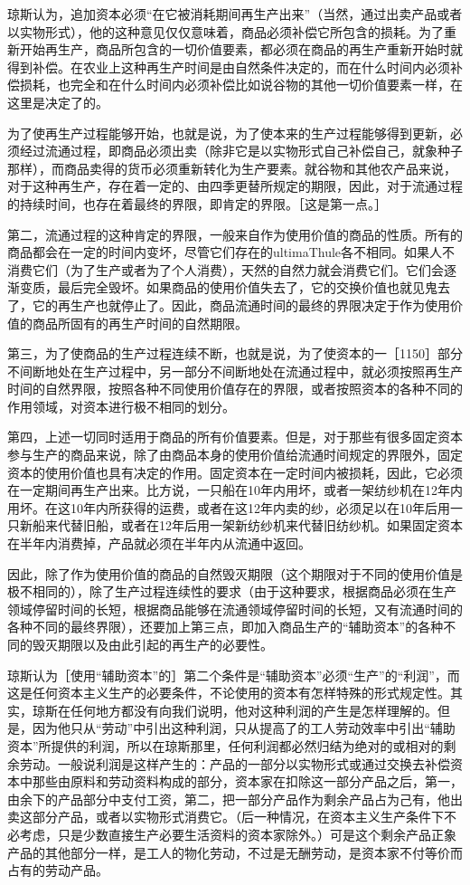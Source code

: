 琼斯认为，追加资本必须“在它被消耗期间再生产出来”（当然，通过出卖产品或者以实物形式），他的这种意见仅仅意味着，商品必须补偿它所包含的损耗。为了重新开始再生产，商品所包含的一切价值要素，都必须在商品的再生产重新开始时就得到补偿。在农业上这种再生产时间是由自然条件决定的，而在什么时间内必须补偿损耗，也完全和在什么时间内必须补偿比如说谷物的其他一切价值要素一样，在这里是决定了的。

为了使再生产过程能够开始，也就是说，为了使本来的生产过程能够得到更新，必须经过流通过程，即商品必须出卖（除非它是以实物形式自己补偿自己，就象种子那样），而商品卖得的货币必须重新转化为生产要素。就谷物和其他农产品来说，对于这种再生产，存在着一定的、由四季更替所规定的期限，因此，对于流通过程的持续时间，也存在着最终的界限，即肯定的界限。［这是第一点。］

第二，流通过程的这种肯定的界限，一般来自作为使用价值的商品的性质。所有的商品都会在一定的时间内变坏，尽管它们存在的ultimaThule各不相同。如果人不消费它们（为了生产或者为了个人消费），天然的自然力就会消费它们。它们会逐渐变质，最后完全毁坏。如果商品的使用价值失去了，它的交换价值也就见鬼去了，它的再生产也就停止了。因此，商品流通时间的最终的界限决定于作为使用价值的商品所固有的再生产时间的自然期限。

第三，为了使商品的生产过程连续不断，也就是说，为了使资本的一［1150］部分不间断地处在生产过程中，另一部分不间断地处在流通过程中，就必须按照再生产时间的自然界限，按照各种不同使用价值存在的界限，或者按照资本的各种不同的作用领域，对资本进行极不相同的划分。

第四，上述一切同时适用于商品的所有价值要素。但是，对于那些有很多固定资本参与生产的商品来说，除了由商品本身的使用价值给流通时间规定的界限外，固定资本的使用价值也具有决定的作用。固定资本在一定时间内被损耗，因此，它必须在一定期间再生产出来。比方说，一只船在10年内用坏，或者一架纺纱机在12年内用坏。在这10年内所获得的运费，或者在这12年内卖的纱，必须足以在10年后用一只新船来代替旧船，或者在12年后用一架新纺纱机来代替旧纺纱机。如果固定资本在半年内消费掉，产品就必须在半年内从流通中返回。

因此，除了作为使用价值的商品的自然毁灭期限（这个期限对于不同的使用价值是极不相同的），除了生产过程连续性的要求（由于这种要求，根据商品必须在生产领域停留时间的长短，根据商品能够在流通领域停留时间的长短，又有流通时间的各种不同的最终界限），还要加上第三点，即加入商品生产的“辅助资本”的各种不同的毁灭期限以及由此引起的再生产的必要性。

琼斯认为［使用“辅助资本”的］第二个条件是“辅助资本”必须“生产”的“利润”，而这是任何资本主义生产的必要条件，不论使用的资本有怎样特殊的形式规定性。其实，琼斯在任何地方都没有向我们说明，他对这种利润的产生是怎样理解的。但是，因为他只从“劳动”中引出这种利润，只从提高了的工人劳动效率中引出“辅助资本”所提供的利润，所以在琼斯那里，任何利润都必然归结为绝对的或相对的剩余劳动。一般说利润是这样产生的：产品的一部分以实物形式或通过交换去补偿资本中那些由原料和劳动资料构成的部分，资本家在扣除这一部分产品之后，第一，由余下的产品部分中支付工资，第二，把一部分产品作为剩余产品占为己有，他出卖这部分产品，或者以实物形式消费它。（后一种情况，在资本主义生产条件下不必考虑，只是少数直接生产必要生活资料的资本家除外。）可是这个剩余产品正象产品的其他部分一样，是工人的物化劳动，不过是无酬劳动，是资本家不付等价而占有的劳动产品。

